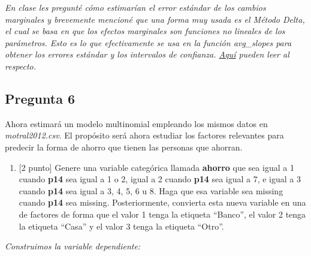 \documentclass[
  letterpaper,
  DIV=11,
  numbers=noendperiod]{scrartcl}
\providecommand{\tightlist}{%
  \setlength{\itemsep}{0pt}\setlength{\parskip}{0pt}}\usepackage{longtable,booktabs,array}
\begin{document}
\emph{En clase les pregunté cómo estimarían el error estándar de los
cambios marginales y brevemente mencioné que una forma muy usada es el
Método Delta, el cual se basa en que los efectos marginales son
funciones no lineales de los parámetros. Esto es lo que efectivamente se
usa en la función avg\_slopes para obtener los errores estándar y los
intervalos de confianza.
\href{https://marginaleffects.com/articles/uncertainty.html}{Aquí}
pueden leer al respecto.}

\hypertarget{pregunta-6}{%
\subsection{Pregunta 6}\label{pregunta-6}}

Ahora estimará un modelo multinomial empleando los mismos datos en
\emph{motral2012.csv}. El propósito será ahora estudiar los factores
relevantes para predecir la forma de ahorro que tienen las personas que
ahorran.

\begin{enumerate}
\def\labelenumi{\alph{enumi}.}
\tightlist
\item
  {[}2 punto{]} Genere una variable categórica llamada \textbf{ahorro}
  que sea igual a 1 cuando \textbf{p14} sea igual a 1 o 2, igual a 2
  cuando \textbf{p14} sea igual a 7, e igual a 3 cuando \textbf{p14} sea
  igual a 3, 4, 5, 6 u 8. Haga que esa variable sea missing cuando
  \textbf{p14} sea missing. Posteriormente, convierta esta nueva
  variable en una de factores de forma que el valor 1 tenga la etiqueta
  ``Banco'', el valor 2 tenga la etiqueta ``Casa'' y el valor 3 tenga la
  etiqueta ``Otro''.
\end{enumerate}

\emph{Construimos la variable dependiente:}
\end{document}
